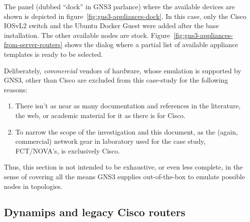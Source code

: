 
The panel (dubbed ``dock'' in GNS3 parlance) where the available devices are shown is depicted in figure~\ref{fig:gns3-appliances-dock}.
In this case, only the Cisco IOSvL2 switch and the Ubuntu Docker Guest were added after the base installation.
The other available nodes are stock.
Figure~\ref{fig:gns3-appliances-from-server-routers} shows the dialog where a partial list of available appliance templates is ready to be selected.



Deliberately, \emph{commercial} vendors of hardware, whose emulation is supported by GNS3, other than Cisco are excluded from this case-study for the following reasons:

\begin{enumerate}
  \item There isn't as near as many documentation and references in the literature, the web, or academic material for it as there is for Cisco.
  \item To narrow the scope of the investigation and this document, as the (again, commercial) network gear in laboratory used for the case study, FCT/NOVA's, is exclusively Cisco.
\end{enumerate}

Thus, this section is not intended to be exhaustive, or even less complete, in the sense of covering all the means GNS3 supplies out-of-the-box to emulate possible nodes in topologies.

\subsection{Dynamips and legacy Cisco routers}
\label{subsec:gns3dynamipslegacy}

